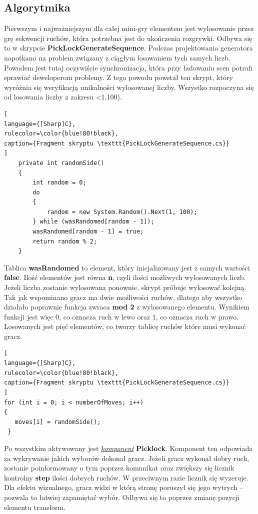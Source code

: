 \documentclass[oneside,polski,logo]{amuthesis}
\begin{document}
\subsection{Algorytmika}
\par Pierwszym i najważniejszym dla całej mini-gry elementem jest wylosowanie przez grę sekwencji ruchów, która potrzebna jest do ukończenia rozgrywki. Odbywa się to w skrypcie \textbf{PickLockGenerateSequence}. Podczas projektowania generatora napotkano na problem związany z ciągłym losowaniem tych samych liczb. Powodem jest tutaj oczywiście synchronizacja, która przy ładowaniu scen potrafi sprawiać deweloperom problemy. Z tego powodu powstał ten skrypt, który wyróżnia się weryfikacją unikalności wylosowanej liczby.
Wszystko rozpoczyna się od losowania liczby z zakresu <1,100). \clearpage
\begin{lstlisting}[
language={[Sharp]C},
rulecolor=\color{blue!80!black},
caption={Fragment skryptu \texttt{PickLockGenerateSequence.cs}}
]
    private int randomSide()
    {
        int random = 0;
        do
        {
            random = new System.Random().Next(1, 100);
        } while (wasRandomed[random - 1]);
        wasRandomed[random - 1] = true;
        return random % 2;
    }
\end{lstlisting}
Tablica \textbf{wasRandomed} to element, który inicjalizowany jest z samych wartości \textbf{false}. Ilość elementów jest równa \textbf{n}, czyli ilości możliwych wylosowanych liczb. Jeżeli liczba zostanie wylosowana ponownie, skrypt próbuje wylosować kolejną. Tak jak wspominano gracz ma dwie możliwości ruchów, dlatego aby wszystko działało poprawnie funkcja zwraca \textbf{mod 2} z wylosowanego elementu. Wynikiem funkcji jest więc 0, co oznacza ruch w lewo oraz 1, co oznacza ruch w prawo. Losowanych jest pięć elementów, co tworzy tablicę ruchów które musi wykonać gracz.

\begin{lstlisting}[
language={[Sharp]C},
rulecolor=\color{blue!80!black},
caption={Fragment skryptu \texttt{PickLockGenerateSequence.cs}}
]
for (int i = 0; i < numberOfMoves; i++)
{
   moves[i] = randomSide();
 }
\end{lstlisting}
Po wszystkim aktywowany jest \hyperref[sec:komponent]{\emph{komponent}} \textbf{Picklock}. Komponent ten odpowiada za wykrywanie jakich wyborów dokonał gracz. Jeżeli gracz wykonał dobry ruch, zostanie poinformowany o tym poprzez komunikat oraz zwiększy się licznik kontrolny \textbf{step} ilości dobrych ruchów. W przeciwnym razie licznik się wyzeruje. Dla efektu wizualnego, gracz widzi w którą stronę poruszył się jego wytrych – pozwala to łatwiej zapamiętać wybór. Odbywa się to poprzez zmianę pozycji elementu transform.
\end{document}
